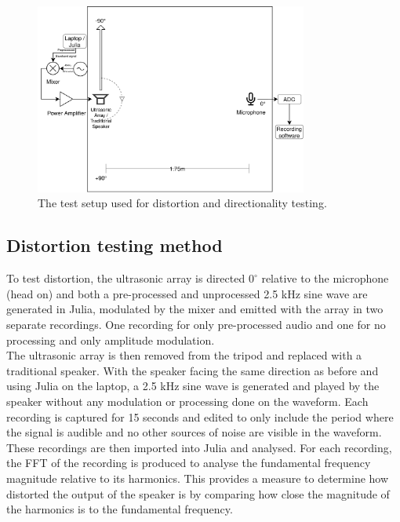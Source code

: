 \begin{figure}[ht!]
    \centering
    \includegraphics[width=0.8\textwidth]{Figures/Testing/Test_setup.png}
    \caption{The test setup used for distortion and directionality testing.}
    \label{fig:testsetup}
\end{figure}
\newpage
\subsection{Distortion testing method}
To test distortion, the ultrasonic array is directed  $0^\circ$ relative to the microphone (head on) and both a pre-processed and unprocessed 2.5 kHz sine wave are generated in Julia, modulated by the mixer and emitted with the array in two separate recordings. One recording for only pre-processed audio and one for no processing and only amplitude modulation.\\
The ultrasonic array is then removed from the tripod and replaced with a traditional speaker. With the speaker facing the same direction as before and using Julia on the laptop, a 2.5 kHz sine wave is generated and played by the speaker without any modulation or processing done on the waveform.
Each recording is captured for 15 seconds and edited to only include the period where the signal is audible and no other sources of noise are visible in the waveform.\\
These recordings are then imported into Julia and analysed. For each recording, the FFT of the recording is produced to analyse the fundamental frequency magnitude relative to its harmonics. This provides a measure to determine how distorted the output of the speaker is by comparing how close the magnitude of the harmonics is to the fundamental frequency.

\newpage


